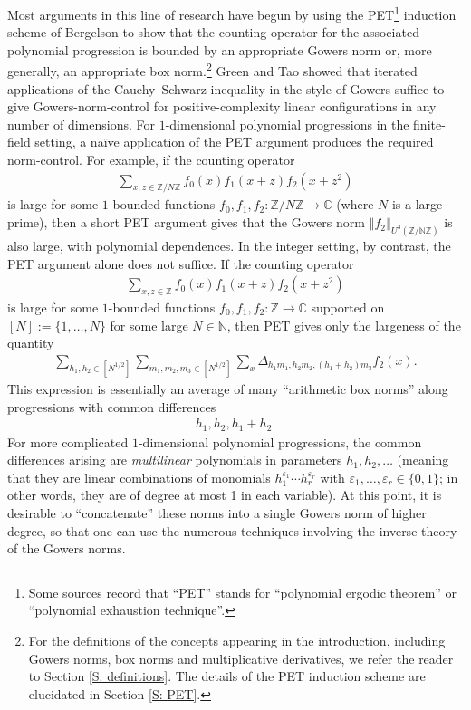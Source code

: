 \documentclass[11pt]{amsart}
\theoremstyle{definition}
\newcommand{\C}{{\mathbb C}}
\newcommand{\N}{{\mathbb N}}
\newcommand{\Z}{{\mathbb Z}}
\newcommand{\eps}{\varepsilon}
\newcommand{\norm}[1]{\left\Vert #1\right\Vert}
\begin{document}
Most arguments in this line of research have begun by using the PET\footnote{Some sources record that ``PET'' stands for ``polynomial ergodic theorem'' or ``polynomial exhaustion technique''.} induction scheme of Bergelson \cite{Ber87} to show that the counting operator for the associated polynomial progression is bounded by an appropriate Gowers norm or, more generally, an appropriate box norm.\footnote{For the definitions of the concepts appearing in the introduction, including Gowers norms, box norms and multiplicative derivatives, we refer the reader to Section \ref{S: definitions}. The details of the PET induction scheme are elucidated in Section \ref{S: PET}.}  Green and Tao \cite{GT10b} showed that iterated applications of the Cauchy--Schwarz inequality in the style of Gowers \cite{Go98a, Go01} suffice to give Gowers-norm-control for positive-complexity linear configurations in any number of dimensions.  For $1$-dimensional polynomial progressions in the finite-field setting, a na\"ive application of the PET argument produces the required norm-control.  For example, if the counting operator
\begin{align*}
\sum_{x,z\in\Z/N\Z} f_0(x)f_1(x+z)f_2(x+z^2) %
\end{align*}
is large for some $1$-bounded functions $f_0, f_1, f_2:\Z/N\Z\to\C$ (where $N$ is a large prime), then a short PET argument gives that the Gowers norm $\norm{f_2}_{U^3(\Z/\N\Z)}$ is also large, with polynomial dependences.  In the integer setting, by contrast, the PET argument alone does not suffice.  If the counting operator
\begin{align*}
    \sum_{x, z\in\Z}f_0(x)f_1(x+z)f_2(x+z^2)
\end{align*}
is large for some $1$-bounded functions $f_0, f_1, f_2:\Z\to\C$ supported on $[N]:=\{1, \ldots, N\}$ for some large $N\in\N$, then PET gives only the largeness of the quantity
\begin{align*}
    \sum_{h_1, h_2\in[N^{1/2}]}\sum_{m_1,m_2,m_3\in[N^{1/2}]}\sum_x\Delta_{h_1 m_1, h_2 m_2, (h_1+h_2) m_3}f_2(x).
\end{align*}
This expression is essentially an average of many ``arithmetic box norms'' along progressions with common differences 
\begin{align}\label{E: single dim directions}
    h_1, h_2, h_1 + h_2.    
\end{align}
For more complicated $1$-dimensional polynomial progressions, the common differences arising are \textit{multilinear} polynomials in parameters $h_1, h_2, \ldots$ {(meaning that they are linear combinations of monomials $h_1^{\eps_1}\cdots h_r^{\eps_r}$ with $\eps_1, \ldots, \eps_r\in\{0,1\}$; in other words, they are of degree at most 1 in each variable)}.  At this point, it is desirable to ``concatenate'' these norms into a single Gowers norm of higher degree, so that one can use the numerous techniques involving the inverse theory of the Gowers norms.
\end{document}
